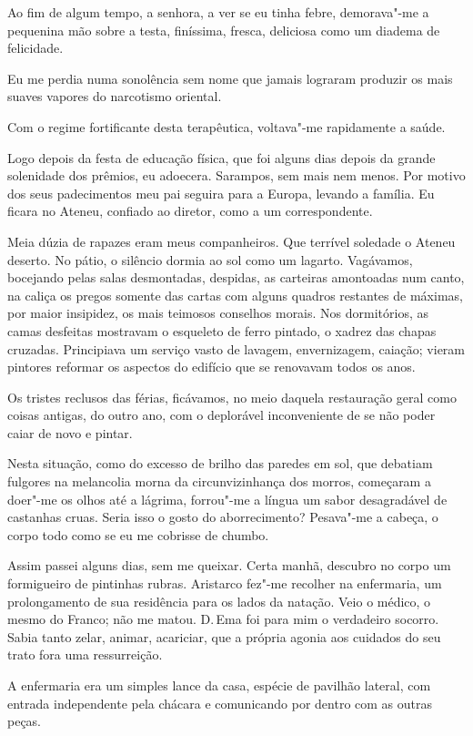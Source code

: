 Ao fim de algum tempo, a senhora, a ver se eu tinha febre, demorava"-me
a pequenina mão sobre a testa, finíssima, fresca, deliciosa como um
diadema de felicidade. 

Eu me perdia numa sonolência sem nome que jamais
lograram produzir os mais suaves vapores do narcotismo oriental. 

Com o regime fortificante desta terapêutica, voltava"-me rapidamente a
saúde. 

Logo depois da festa de educação física, que foi alguns dias
depois da grande solenidade dos prêmios, eu adoecera. Sarampos, sem
mais nem menos. Por motivo dos seus padecimentos meu pai seguira para a
Europa, levando a família. Eu ficara no Ateneu, confiado ao diretor,
como a um correspondente. 

Meia dúzia de rapazes eram meus companheiros.
Que terrível soledade o Ateneu deserto. No pátio, o silêncio dormia ao
sol como um lagarto. Vagávamos, bocejando pelas salas desmontadas,
despidas, as carteiras amontoadas num canto, na caliça os pregos
somente das cartas com alguns quadros restantes de máximas, por maior
insipidez, os mais teimosos conselhos morais. Nos dormitórios, as camas
desfeitas mostravam o esqueleto de ferro pintado, o xadrez das chapas
cruzadas. Principiava um serviço vasto de lavagem, envernizagem,
caiação; vieram pintores reformar os aspectos do edifício que se
renovavam todos os anos. 

Os tristes reclusos das férias, ficávamos, no
meio daquela restauração geral como coisas antigas, do outro ano, com o
deplorável inconveniente de se não poder caiar de novo e pintar. 

Nesta situação, como do excesso de brilho das paredes em sol, que debatiam
fulgores na melancolia morna da circunvizinhança dos morros, começaram
a doer"-me os olhos até a lágrima, forrou"-me a língua um sabor
desagradável de castanhas cruas. Seria isso o gosto do aborrecimento?
Pesava"-me a cabeça, o corpo todo como se eu me cobrisse de chumbo.

Assim passei alguns dias, sem me queixar. Certa manhã, descubro no
corpo um formigueiro de pintinhas rubras. Aristarco fez"-me recolher
na enfermaria, um prolongamento de sua residência para os lados da
natação. Veio o médico, o mesmo do Franco; não me matou. D.\,Ema foi
para mim o verdadeiro socorro. Sabia tanto zelar, animar, acariciar,
que a própria agonia aos cuidados do seu trato fora uma ressurreição. 

A enfermaria era um simples lance da casa, espécie de pavilhão lateral,
com entrada independente pela chácara e comunicando por dentro com as
outras peças. 

